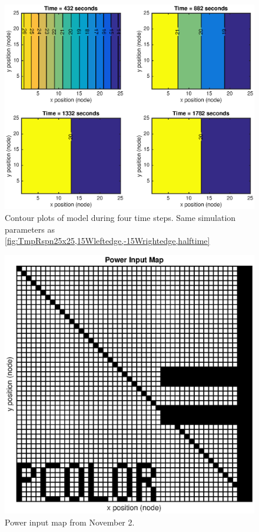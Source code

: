 \documentclass[10pt,twocolumn]{article}
\begin{document}
\begin{figure}
	\center
	\includegraphics[width=0.8\linewidth]{CtrTnst25x25,15Wleftedge,-15Wrightedge,halftime.eps}
	\caption{Contour plots of model during four time steps. Same simulation parameters as \autoref{fig:TmpRspn25x25,15Wleftedge,-15Wrightedge,halftime}}
	\label{fig:CtrTnst25x25,15Wleftedge,-15Wrightedge,halftime}
\end{figure}

\begin{figure}
	\center
	\includegraphics[width=0.8\linewidth]{Nov2Map,it0,pi150.eps}
	\caption{Power input map from November 2.}
	\label{fig:Nov2Map,it0,pi150}
\end{figure}
\end{document}
